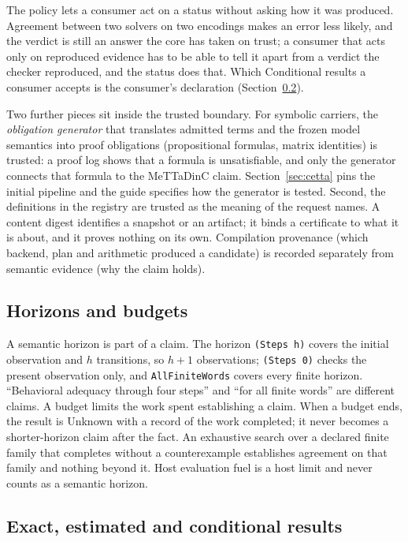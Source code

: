 \documentclass[11pt]{article}
\newcommand{\code}[1]{\texttt{#1}}
\theoremstyle{definition}
\theoremstyle{plain}
\begin{document}
The policy lets a consumer act on a status without asking how it was produced. Agreement between
two solvers on two encodings makes an error less likely, and the verdict is still an answer the
core has taken on trust; a consumer that acts only on reproduced evidence has to be able to tell it
apart from a verdict the checker reproduced, and the status does that. Which Conditional results a
consumer accepts is the consumer's declaration (Section~\ref{sec:accept}).

Two further pieces sit inside the trusted boundary. For symbolic carriers, the \emph{obligation
generator} that translates admitted terms and the frozen model semantics into proof obligations
(propositional formulas, matrix identities) is trusted: a proof log shows that a formula is
unsatisfiable, and only the generator connects that formula to the MeTTaDinC claim.
Section~\ref{sec:cetta} pins the initial pipeline and the guide specifies how the generator is
tested. Second, the definitions in the registry are trusted as the meaning of the request names. A
content digest identifies a snapshot or an artifact; it binds a certificate to what it is about,
and it proves nothing on its own. Compilation provenance (which backend, plan and arithmetic
produced a candidate) is recorded separately from semantic evidence (why the claim holds).

\subsection{Horizons and budgets}

A semantic horizon is part of a claim. The horizon \code{(Steps h)} covers the initial
observation and $h$ transitions, so $h+1$ observations; \code{(Steps 0)} checks the present
observation only, and \code{AllFiniteWords} covers every finite horizon. ``Behavioral adequacy
through four steps'' and ``for all finite words'' are different claims. A budget limits the work
spent establishing a claim. When a budget ends, the result is Unknown with a record of the work
completed; it never becomes a shorter-horizon claim after the fact. An exhaustive search over a
declared finite family that completes without a counterexample establishes agreement on that
family and nothing beyond it. Host evaluation fuel is a host limit and never counts as a semantic
horizon.

\subsection{Exact, estimated and conditional results}\label{sec:accept}
\end{document}
